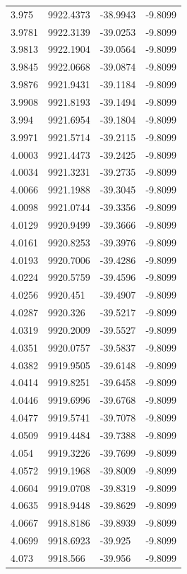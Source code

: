 \begin{table}[H]
\begin{tabular}{llll}
3.975 & 9922.4373 & -38.9943 & -9.8099 \\
3.9781 & 9922.3139 & -39.0253 & -9.8099 \\
3.9813 & 9922.1904 & -39.0564 & -9.8099 \\
3.9845 & 9922.0668 & -39.0874 & -9.8099 \\
3.9876 & 9921.9431 & -39.1184 & -9.8099 \\
3.9908 & 9921.8193 & -39.1494 & -9.8099 \\
3.994 & 9921.6954 & -39.1804 & -9.8099 \\
3.9971 & 9921.5714 & -39.2115 & -9.8099 \\
4.0003 & 9921.4473 & -39.2425 & -9.8099 \\
4.0034 & 9921.3231 & -39.2735 & -9.8099 \\
4.0066 & 9921.1988 & -39.3045 & -9.8099 \\
4.0098 & 9921.0744 & -39.3356 & -9.8099 \\
4.0129 & 9920.9499 & -39.3666 & -9.8099 \\
4.0161 & 9920.8253 & -39.3976 & -9.8099 \\
4.0193 & 9920.7006 & -39.4286 & -9.8099 \\
4.0224 & 9920.5759 & -39.4596 & -9.8099 \\
4.0256 & 9920.451 & -39.4907 & -9.8099 \\
4.0287 & 9920.326 & -39.5217 & -9.8099 \\
4.0319 & 9920.2009 & -39.5527 & -9.8099 \\
4.0351 & 9920.0757 & -39.5837 & -9.8099 \\
4.0382 & 9919.9505 & -39.6148 & -9.8099 \\
4.0414 & 9919.8251 & -39.6458 & -9.8099 \\
4.0446 & 9919.6996 & -39.6768 & -9.8099 \\
4.0477 & 9919.5741 & -39.7078 & -9.8099 \\
4.0509 & 9919.4484 & -39.7388 & -9.8099 \\
4.054 & 9919.3226 & -39.7699 & -9.8099 \\
4.0572 & 9919.1968 & -39.8009 & -9.8099 \\
4.0604 & 9919.0708 & -39.8319 & -9.8099 \\
4.0635 & 9918.9448 & -39.8629 & -9.8099 \\
4.0667 & 9918.8186 & -39.8939 & -9.8099 \\
4.0699 & 9918.6923 & -39.925 & -9.8099 \\
4.073 & 9918.566 & -39.956 & -9.8099 \\

\end{tabular}
\end{table}
